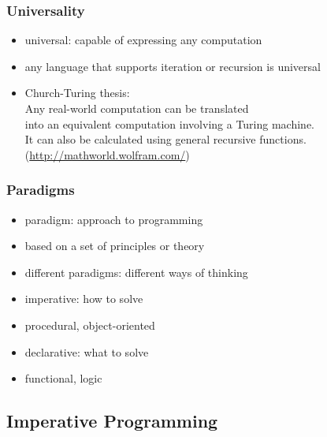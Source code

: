 \documentclass[dvipsnames]{beamer}
\theoremstyle{plain}
\begin{document}
\begin{frame}
  \frametitle{Universality}

  \begin{itemize}
    \item \alert{universal}: capable of expressing any computation
    \item any language that supports iteration or recursion is universal

    \pause
    \bigskip
    \item \alert{Church-Turing thesis}:\\
    \smallskip
    Any real-world computation can be translated\\
    into an equivalent computation involving a Turing machine.\\
    \medskip
    It can also be calculated using general recursive functions.\\
    \smallskip
    (\url{http://mathworld.wolfram.com/})
  \end{itemize}
\end{frame}

\begin{frame}
  \frametitle{Paradigms}

  \begin{itemize}
    \item \alert{paradigm}: approach to programming
    \item based on a set of principles or theory
    \item different paradigms: different ways of thinking

    \pause
    \bigskip
    \item \alert{imperative}: how to solve
    \item procedural, object-oriented

    \medskip
    \item \alert{declarative}: what to solve
    \item functional, logic
  \end{itemize}
\end{frame}

\subsection{Imperative Programming}
\end{document}
